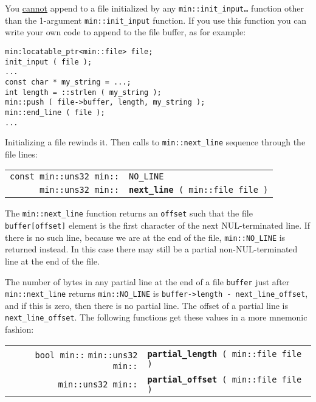 \documentclass[12pt]{article}
\makeatletter
\newcommand{\ttindex}[1]{\index{#1@{\tt #1}}}
\newcommand{\minindex}[1]{\ttindex{min::#1}\ttindex{#1}}
\newcommand{\EOL}{\penalty \exhyphenpenalty}
\newenvironment{indpar}[1][0.3in]%
	{\begin{list}{}%
		     {\setlength{\itemsep}{0in}%
		      \setlength{\topsep}{0in}%
		      \setlength{\parsep}{1ex}%
		      \setlength{\labelwidth}{#1}%
		      \setlength{\leftmargin}{#1}%
		      \addtolength{\leftmargin}{\labelsep}}%
	 \item}%
	{\end{list}}
\newcommand{\LABEL}[1]{\label{#1}}
\newcommand{\MINKEY}[1]{{\tt \bf #1}\minindex{#1}}
\newcommand{\MINNBKEY}[1]{{\tt #1}\minindex{#1}}
\makeatother
\begin{document}
You \underline{cannot} append to a file initialized by any
{\tt min::\EOL init\_\EOL input\ldots} function other than
the 1-argument {\tt min::\EOL init\_\EOL input} function.
If you use this function you can write your own code to append
to the file buffer, as for example:
\begin{indpar}\begin{verbatim}
min:locatable_ptr<min::file> file;
init_input ( file );
...
const char * my_string = ...;
int length = ::strlen ( my_string );
min::push ( file->buffer, length, my_string );
min::end_line ( file );
...
\end{verbatim}\end{indpar}

Initializing a file rewinds it.  Then calls to
{\tt min::\EOL next\_\EOL line} sequence through the file
lines:

\begin{indpar}[1em]\begin{tabular}{r@{}l}
\verb|const min::uns32 min::| & \MINNBKEY{NO\_LINE}
\LABEL{MIN::NO_LINE} \\
\verb|min::uns32 min::|
    & \MINKEY{next\_line}\verb| ( min::file file )|
\LABEL{MIN::NEXT_LINE_OF_FILE} \\
\end{tabular}\end{indpar}

The {\tt min::\EOL next\_\EOL line} function returns an
{\tt offset} such that the file {\tt buffer[offset]} element
is the first character of the next NUL-terminated line.
If there is no such line, because we are at the end of the file,
{\tt min::\EOL NO\_\EOL LINE} is returned instead.  In this case
there may still be a partial non-NUL-terminated line at the end
of the file.

The number of bytes in any partial line at the end of a file
{\tt buffer} just after {\tt min::\EOL next\_\EOL line} returns
{\tt min::\EOL NO\_\EOL LINE} is
{\tt buffer->\EOL length - next\_\EOL line\_\EOL offset}, and if this
is zero, then there is no partial line.
The offset of a partial line is {\tt next\_\EOL line\_\EOL offset}.
The following functions get these values in
a more mnemonic fashion:

\begin{indpar}[1em]\begin{tabular}{r@{}l}
\verb|bool min::|
\verb|min::uns32 min::|
    & \MINKEY{partial\_\EOL length}\verb| ( min::file file )|
\LABEL{MIN::PARTIAL_LENGTH} \\
\verb|min::uns32 min::|
    & \MINKEY{partial\_\EOL offset}\verb| ( min::file file )|
\LABEL{MIN::PARTIAL_OFFSET} \\
\end{tabular}\end{indpar}
\end{document}
